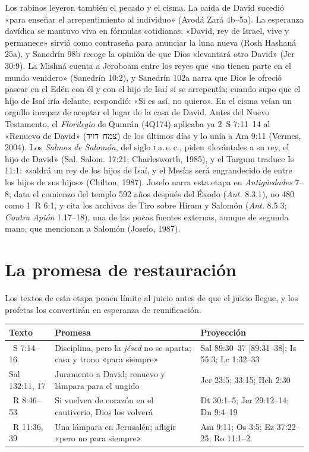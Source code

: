 \documentclass[11pt,letterpaper]{article}
\newcommand{\heb}[1]{\mbox{\foreignlanguage{hebrew}{#1}}}
\begin{document}
Los rabinos leyeron también el pecado y el cisma. La caída de David sucedió «para enseñar el arrepentimiento al individuo» (Avodá Zará 4b--5a). La esperanza davídica se mantuvo viva en fórmulas cotidianas: «David, rey de Israel, vive y permanece» sirvió como contraseña para anunciar la luna nueva (Rosh Hashaná 25a), y Sanedrín 98b recoge la opinión de que Dios «levantará otro David» (Jer 30:9). La Mishná cuenta a Jeroboam entre los reyes que «no tienen parte en el mundo venidero» (Sanedrín 10:2), y Sanedrín 102a narra que Dios le ofreció pasear en el Edén con él y con el hijo de Isaí si se arrepentía; cuando supo que el hijo de Isaí iría delante, respondió: «Si es así, no quiero». En el cisma veían un orgullo incapaz de aceptar el lugar de la casa de David. Antes del Nuevo Testamento, el \emph{Florilegio} de Qumrán (4Q174) aplicaba ya 2~S 7:11--14 al «Renuevo de David» (\heb{צמח דויד}) de los últimos días y lo unía a Am 9:11 (Vermes, 2004). Los \emph{Salmos de Salomón}, del siglo \textsc{i} a.\,e.\,c., piden «levántales a su rey, el hijo de David» (Sal. Salom. 17:21; Charlesworth, 1985), y el Targum traduce Is 11:1: «saldrá un rey de los hijos de Isaí, y el Mesías será engrandecido de entre los hijos de sus hijos» (Chilton, 1987). Josefo narra esta etapa en \emph{Antigüedades} 7--8; data el comienzo del templo 592 años después del Éxodo (\emph{Ant.} 8.3.1), no 480 como 1~R 6:1, y cita los archivos de Tiro sobre Hiram y Salomón (\emph{Ant.} 8.5.3; \emph{Contra Apión} 1.17--18), una de las pocas fuentes externas, aunque de segunda mano, que mencionan a Salomón (Josefo, 1987).

\section{La promesa de restauración}

Los textos de esta etapa ponen límite al juicio antes de que el juicio llegue, y los profetas los convertirán en esperanza de reunificación.

\begin{center}\small
\renewcommand{\arraystretch}{1.25}
\begin{tabular}{>{\RaggedRight\arraybackslash}p{2.5cm}>{\RaggedRight\arraybackslash}p{5.5cm}>{\RaggedRight\arraybackslash}p{5.9cm}}
\toprule
\textbf{Texto} & \textbf{Promesa} & \textbf{Proyección}\\
\midrule
2~S 7:14--16 & Disciplina, pero la \emph{jésed} no se aparta; casa y trono «para siempre» & Sal 89:30--37 [89:31--38]; Is 55:3; Lc 1:32--33\\
Sal 132:11, 17 & Juramento a David; renuevo y lámpara para el ungido & Jer 23:5; 33:15; Hch 2:30\\
1~R 8:46--53 & Si vuelven de corazón en el cautiverio, Dios los volverá & Dt 30:1--5; Jer 29:12--14; Dn 9:4--19\\
1~R 11:36, 39 & Una lámpara en Jerusalén; afligir «pero no para siempre» & Am 9:11; Os 3:5; Ez 37:22--25; Ro 11:1--2\\
\bottomrule
\end{tabular}\end{center}
\end{document}
